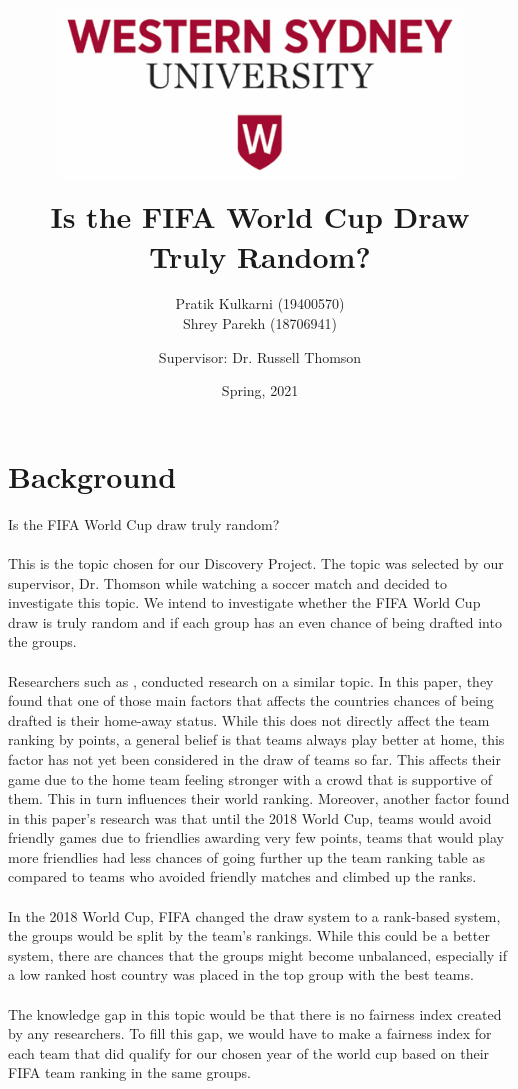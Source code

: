 \documentclass[11pt,a4paper]{article}
\title{
\includegraphics[height=5cm,width=0.8\textwidth]{WSU.PNG}\\
Is the FIFA World Cup Draw Truly Random?}
\author{Pratik Kulkarni (19400570)\\ Shrey Parekh (18706941)}
\affil{Project proposal for 301111 Discovery Project}
\author{Supervisor: Dr. Russell Thomson}
\affil{School of Computer, Data and Mathematical Sciences, \\ Western Sydney University}
\date{Spring, 2021}
\begin{document}
\nocite{*}

\maketitle


\newpage

\renewcommand\contentsname{Table of Contents}

\tableofcontents

\newpage

\section{Background}


Is the FIFA World Cup draw truly random?
\\ \\
This is the topic chosen for our Discovery Project. The topic was selected by our supervisor, Dr. Thomson while watching a soccer match and decided to investigate this topic.
We intend to investigate whether the FIFA World Cup draw is truly random and if each group has an even chance of being drafted into the groups. 
\\ \\
Researchers such as \citet{cea2020analytics}, conducted research on a similar topic. In this paper, they found that one of those main factors that affects the countries chances of being drafted is their home-away status. While this does not directly affect the team ranking by points, a general belief is that teams always play better at home, this factor has not yet been considered in the draw of teams so far. This affects their game due to the home team feeling stronger with a crowd that is supportive of them. This in turn influences their world ranking. Moreover, another factor found in this paper’s research was that until the 2018 World Cup, teams would avoid friendly games due to friendlies awarding very few points, teams that would play more friendlies had less chances of going further up the team ranking table as compared to teams who avoided friendly matches and climbed up the ranks. 
\\ \\
In the 2018 World Cup, FIFA changed the draw system to a rank-based system, the groups would be split by the team’s rankings. While this could be a better system, there are chances that the groups might become unbalanced, especially if a low ranked host country was placed in the top group with the best teams.
\\ \\
The knowledge gap in this topic would be that there is no fairness index created by any researchers. To fill this gap, we would have to make a fairness index for each team that did qualify for our chosen year of the world cup based on their FIFA team ranking in the same groups.
\end{document}

